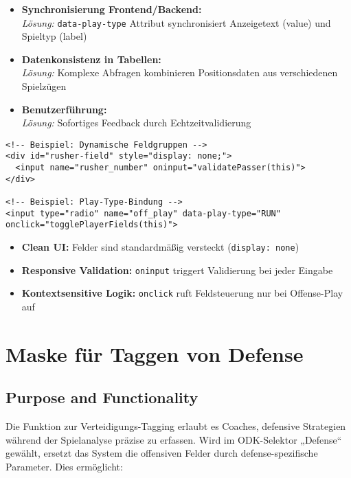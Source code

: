 \begin{itemize}
    \item \textbf{Synchronisierung Frontend/Backend:}\\
    \textit{Lösung:} \texttt{data-play-type} Attribut synchronisiert Anzeigetext (value) und Spieltyp (label)

    \item \textbf{Datenkonsistenz in Tabellen:}\\
    \textit{Lösung:} Komplexe Abfragen kombinieren Positionsdaten aus verschiedenen Spielzügen

    \item \textbf{Benutzerführung:}\\
    \textit{Lösung:} Sofortiges Feedback durch Echtzeitvalidierung
\end{itemize}

\begin{verbatim}
<!-- Beispiel: Dynamische Feldgruppen -->
<div id="rusher-field" style="display: none;">
  <input name="rusher_number" oninput="validatePasser(this)">
</div>

<!-- Beispiel: Play-Type-Bindung -->
<input type="radio" name="off_play" data-play-type="RUN" onclick="togglePlayerFields(this)">
\end{verbatim}

\begin{itemize}
    \item \textbf{Clean UI:} Felder sind standardmäßig versteckt (\texttt{display: none})
    \item \textbf{Responsive Validation:} \texttt{oninput} triggert Validierung bei jeder Eingabe
    \item \textbf{Kontextsensitive Logik:} \texttt{onclick} ruft Feldsteuerung nur bei Offense-Play auf
\end{itemize}

\section{Maske für Taggen von Defense}
\subsection{Purpose and Functionality}

Die Funktion zur Verteidigungs-Tagging erlaubt es Coaches, defensive Strategien während der Spielanalyse präzise zu erfassen. Wird im ODK-Selektor „Defense“ gewählt, ersetzt das System die offensiven Felder durch defense-spezifische Parameter. Dies ermöglicht:

